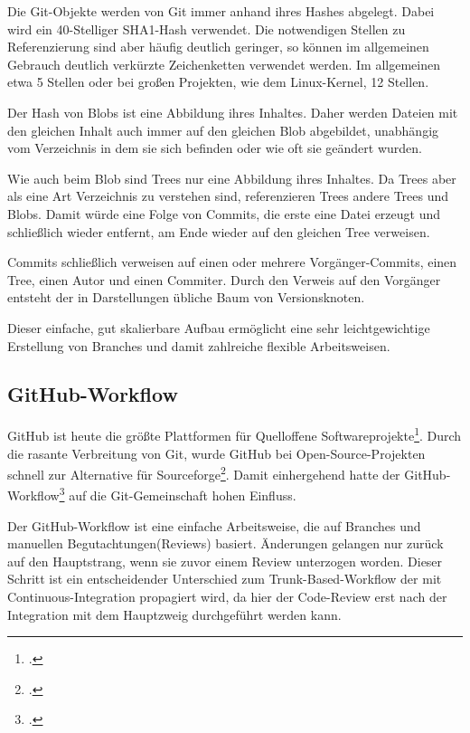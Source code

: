 Die Git-Objekte werden von Git immer anhand ihres Hashes abgelegt. Dabei wird ein 40-Stelliger SHA1-Hash verwendet. Die notwendigen Stellen zu Referenzierung sind aber häufig deutlich geringer, so können im allgemeinen Gebrauch deutlich verkürzte Zeichenketten verwendet werden. Im allgemeinen etwa 5 Stellen oder bei großen Projekten, wie dem Linux-Kernel, 12 Stellen.

Der Hash von Blobs ist eine Abbildung ihres Inhaltes. Daher werden Dateien mit den gleichen Inhalt auch immer auf den gleichen Blob abgebildet, unabhängig vom Verzeichnis in dem sie sich befinden oder wie oft sie geändert wurden.

Wie auch beim Blob sind Trees nur eine Abbildung ihres Inhaltes. Da Trees aber als eine Art Verzeichnis zu verstehen sind, referenzieren Trees andere Trees und Blobs. Damit würde eine Folge von Commits, die erste eine Datei erzeugt und schließlich wieder entfernt, am Ende wieder auf den gleichen Tree verweisen.

Commits schließlich verweisen auf einen oder mehrere Vorgänger-Commits, einen Tree, einen Autor und einen Commiter. Durch den Verweis auf den Vorgänger entsteht der in Darstellungen übliche Baum von Versionsknoten.

Dieser einfache, gut skalierbare Aufbau ermöglicht eine sehr leichtgewichtige Erstellung von Branches und damit zahlreiche flexible Arbeitsweisen.

\subsection{GitHub-Workflow}

GitHub ist heute die größte Plattformen für Quelloffene Softwareprojekte\footcite{github-marketshare-datanyze}. Durch die rasante Verbreitung von Git, wurde GitHub bei Open-Source-Projekten schnell zur Alternative für Sourceforge\footcite{heise-github-2011}. Damit einhergehend hatte der GitHub-Workflow\footcite{github-workflow-intro} auf die Git-Gemeinschaft hohen Einfluss.

Der GitHub-Workflow ist eine einfache Arbeitsweise, die auf Branches und manuellen Begutachtungen(Reviews) basiert. Änderungen gelangen nur zurück auf den Hauptstrang, wenn sie zuvor einem Review unterzogen worden. Dieser Schritt ist ein entscheidender Unterschied zum Trunk-Based-Workflow der mit Continuous-Integration propagiert wird, da hier der Code-Review erst nach der Integration mit dem Hauptzweig durchgeführt werden kann.

